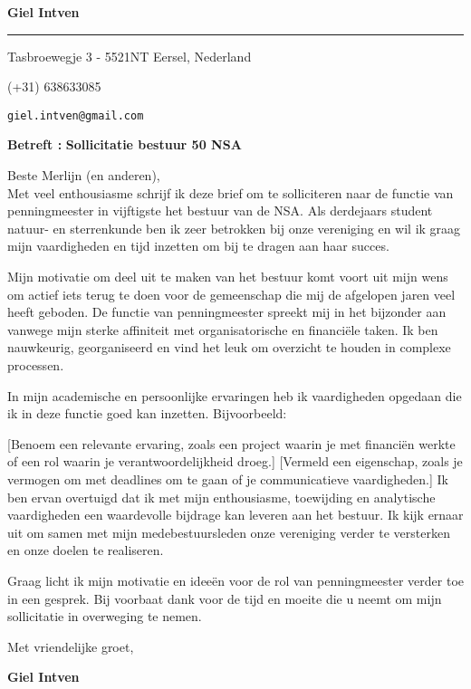 \documentclass[12pt]{article}
\newcommand{\firstname}{Giel Intven}
\newcommand{\mainColor}{blueSky} %
\newlength{\spacebox}
\newcommand{\shspace}{\hspace*{0.8em}}
\newcommand{\svspace}{\vspace*{0.5em}}
\newcommand{\mvspace}{\vspace*{1.5em}}
\newcommand{\negmvspace}{\vspace*{-1em}}
\newcommand{\userInfo}[4]{
    \begin{flushleft}
        \color{\mainColor}
        \Huge
        \textbf{\MakeUppercase{\lastname}}
        \color{black}
        \textbf{\firstname}
        \color{\mainColor}
        \noindent\rule{19.1cm}{0.8pt}
        \color{grayShy}
        \small
        \par
        \parbox{7\spacebox} {
            \faMap \shspace #1 - #2 \par \svspace
            \faPhone \shspace #3 \par \svspace
            \faEnvelopeOpen \shspace \texttt{#4} \par \svspace
        }
        \color{\mainColor}
        \mvspace
    \end{flushleft}
    \negmvspace
}
\newcommand{\object}[1]{
    \small
    \color{\mainColor} \textbf{Betreft :} \color{black} \textbf{#1} \par
}
\newcommand{\content}[2]{
    \mvspace
    \begin{flushleft}
        \parbox{10.3\spacebox}{
          #1\par
          \svspace
          #2
        }\par
    \end{flushleft}
}
\newcommand{\signature}{
    \svspace
    \parbox{3\spacebox}{
      Met vriendelijke groet,\par
      \svspace \hspace{-0.3em}
      \textbf{\color{\mainColor} \MakeUppercase{\lastname} \color{black} \firstname}\par
      \svspace \svspace
      \Huge \faPenNib\par
    }\par
}
\begin{document}
\selectfont
\userInfo{Tasbroewegje 3}{5521NT Eersel, Nederland}{(+31) 638633085}{giel.intven@gmail.com}

\object{Sollicitatie bestuur 50 NSA}
\content{
  Beste Merlijn (en anderen), \\

Met veel enthousiasme schrijf ik deze brief om te solliciteren naar de functie van penningmeester in vijftigste het bestuur van de NSA. Als derdejaars student natuur- en sterrenkunde ben ik zeer betrokken bij onze vereniging en wil ik graag mijn vaardigheden en tijd inzetten om bij te dragen aan haar succes.

Mijn motivatie om deel uit te maken van het bestuur komt voort uit mijn wens om actief iets terug te doen voor de gemeenschap die mij de afgelopen jaren veel heeft geboden. De functie van penningmeester spreekt mij in het bijzonder aan vanwege mijn sterke affiniteit met organisatorische en financiële taken. Ik ben nauwkeurig, georganiseerd en vind het leuk om overzicht te houden in complexe processen.

In mijn academische en persoonlijke ervaringen heb ik vaardigheden opgedaan die ik in deze functie goed kan inzetten. Bijvoorbeeld:

[Benoem een relevante ervaring, zoals een project waarin je met financiën werkte of een rol waarin je verantwoordelijkheid droeg.]
[Vermeld een eigenschap, zoals je vermogen om met deadlines om te gaan of je communicatieve vaardigheden.]
Ik ben ervan overtuigd dat ik met mijn enthousiasme, toewijding en analytische vaardigheden een waardevolle bijdrage kan leveren aan het bestuur. Ik kijk ernaar uit om samen met mijn medebestuursleden onze vereniging verder te versterken en onze doelen te realiseren.

Graag licht ik mijn motivatie en ideeën voor de rol van penningmeester verder toe in een gesprek. Bij voorbaat dank voor de tijd en moeite die u neemt om mijn sollicitatie in overweging te nemen.
}
\signature
\end{document}
